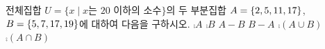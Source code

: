 전체집합 $U=\{x \mid x$는 $20$ 이하의 소수$\}$의 두 부분집합 $A=\{2{,}\mkern3mu\mathopen{}5{,}\mkern3mu\mathopen{}11{,}\mkern3mu\mathopen{}17\}$, $B=\{5{,}\mkern3mu\mathopen{}7{,}\mkern3mu\mathopen{}17{,}\mkern3mu\mathopen{}19\}$에 대하여 다음을 구하시오.
 $\comp{A}$
 $\comp{B}$
 $A-B$
 $B-A$
 $\comp{(A\cup B)}$
 $\comp{(A\cap B)}$

